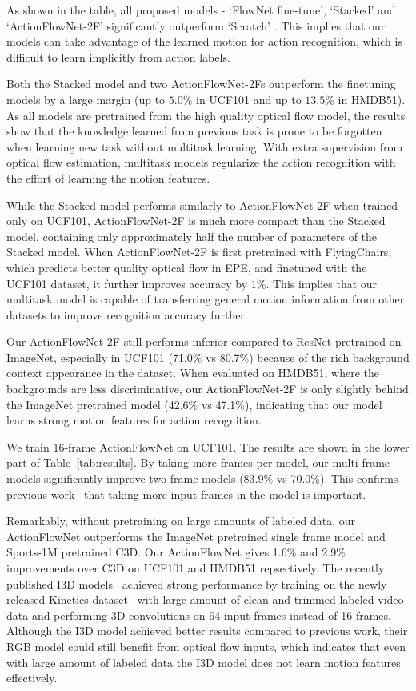 \documentclass[10pt,twocolumn,letterpaper]{article}
\begin{document}
As shown in the table, all proposed models - `FlowNet fine-tune', `Stacked' and `ActionFlowNet-2F' significantly outperform `Scratch' .
This implies that our models can take advantage of the learned motion for action recognition, which is difficult to learn implicitly from action labels.

Both the Stacked model and two ActionFlowNet-2Fs outperform the finetuning models by a large margin (up to $5.0\%$ in UCF101 and up to $13.5\%$ in HMDB51).
As all models are pretrained from the high quality optical flow model, the results show that the knowledge learned from previous task is prone to be forgotten when learning new task without multitask learning.
With extra supervision from optical flow estimation, multitask models regularize the action recognition with the effort of learning the motion features.

While the Stacked model performs similarly to ActionFlowNet-2F when trained only on UCF101, ActionFlowNet-2F is much more compact than the Stacked model, containing only approximately half the number of parameters of the Stacked model.
When ActionFlowNet-2F is first pretrained with FlyingChairs, which predicts better quality optical flow in EPE, and finetuned with the UCF101 dataset, it further improves accuracy by $1\%$.
This implies that our multitask model is capable of transferring general motion information from other datasets to improve recognition accuracy further.

Our ActionFlowNet-2F still performs inferior compared to ResNet pretrained on ImageNet, especially in UCF101 (71.0\% vs 80.7\%) because of the rich background context appearance in the dataset. When evaluated on HMDB51, where the backgrounds are less discriminative, our ActionFlowNet-2F is only slightly behind the ImageNet pretrained model (42.6\% vs 47.1\%), indicating that our model learns strong motion features for action recognition. 

We train 16-frame ActionFlowNet on UCF101. The results are shown in the lower part of Table~\ref{tab:results}. By taking more frames per model, our multi-frame models significantly improve two-frame models (83.9\% vs 70.0\%). This confirms previous work~\cite{karpathyTSLSF14,ngHVVMT15} that taking more input frames in the model is important.

Remarkably, without pretraining on large amounts of labeled data, our ActionFlowNet outperforms the ImageNet pretrained single frame model and Sports-1M pretrained C3D. Our ActionFlowNet gives 1.6\% and 2.9\% improvements over C3D on UCF101 and HMDB51 repsectively. 
The recently published I3D models~\cite{carreira2017quo} achieved strong performance by training on the newly released Kinetics dataset~\cite{kay2017kinetics} with large amount of clean and trimmed labeled video data and performing 3D convolutions on 64 input frames instead of 16 frames.
Although the I3D model achieved better results compared to previous work, their RGB model could still benefit from optical flow inputs, which indicates that even with large amount of labeled data the I3D model does not learn motion features effectively.
\end{document}

